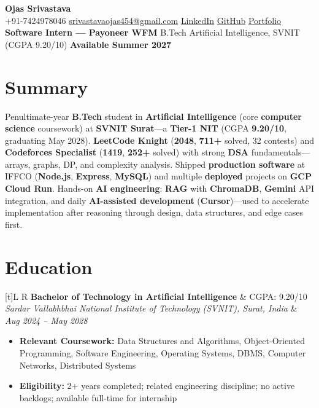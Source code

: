 \documentclass[a4paper,10pt]{article}
\newcommand{\resumeSubheading}[4]{%
  \vspace{0.5mm}
  \noindent
  \begin{tabularx}{\textwidth}[t]{L R}
    \textbf{#1} & #4 \\
    \textit{#3} & \textit{#2} \\
  \end{tabularx}
  \vspace{-0.5mm}%
}
\begin{document}
\selectfont

\begin{center}
  {\LARGE \textbf{Ojas Srivastava}} \\[1mm]
  \small
  +91-7424978046 \textbar{}
  \href{mailto:srivastavaojas454@gmail.com}{srivastavaojas454@gmail.com} \textbar{}
  \href{https://linkedin.com/in/ojas-srivastava05}{LinkedIn} \textbar{}
  \href{https://github.com/Ojas-Srivastava05}{GitHub} \textbar{}
  \href{https://ojas-srivastava.vercel.app}{Portfolio} \\[0.5mm]
  \textbf{Software Intern --- Payoneer WFM} \textbar{}
  B.Tech Arti{f}icial Intelligence, SVNIT (CGPA 9.20/10) \textbar{}
  \textbf{Available Summer 2027}
\end{center}

\vspace{-1mm}

\section{Summary}
\small
Penultimate-year \textbf{B.Tech} student in \textbf{Arti{f}icial Intelligence} (core \textbf{computer science} coursework) at \textbf{SVNIT Surat}---a \textbf{Tier-1 NIT} (CGPA \textbf{9.20/10}, graduating May 2028). \textbf{LeetCode Knight} (\textbf{2048}, \textbf{711+} solved, 32 contests) and \textbf{Codeforces Specialist} (\textbf{1419}, \textbf{252+} solved) with strong \textbf{DSA} fundamentals---arrays, graphs, DP, and complexity analysis. Shipped \textbf{production software} at IFFCO (\textbf{Node.js}, \textbf{Express}, \textbf{MySQL}) and multiple \textbf{deployed} projects on \textbf{GCP Cloud Run}. Hands-on \textbf{AI engineering}: \textbf{RAG} with \textbf{ChromaDB}, \textbf{Gemini} API integration, and daily \textbf{AI-assisted development} (\textbf{Cursor})---used to accelerate implementation after reasoning through design, data structures, and edge cases first.

\section{Education}
\small
\resumeSubheading
  {Bachelor of Technology in Arti{f}icial Intelligence}{Aug 2024 -- May 2028}
  {Sardar Vallabhbhai National Institute of Technology (SVNIT), Surat, India}{CGPA: 9.20/10}
\begin{itemize}
  \item \textbf{Relevant Coursework:} Data Structures and Algorithms, Object-Oriented Programming, Software Engineering, Operating Systems, DBMS, Computer Networks, Distributed Systems
  \item \textbf{Eligibility:} 2+ years completed; related engineering discipline; no active backlogs; available full-time for internship
\end{itemize}
\end{document}
